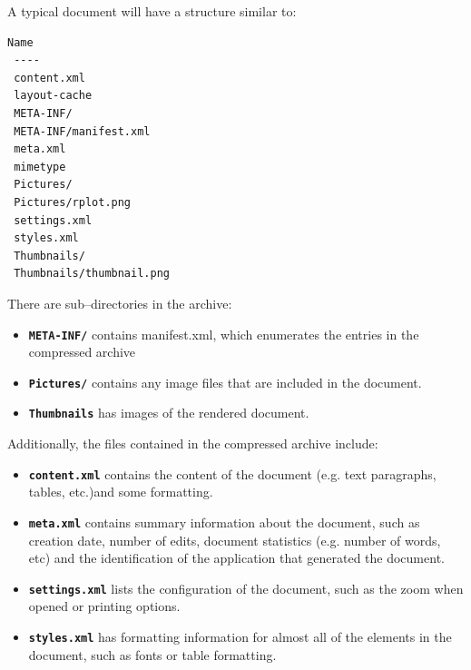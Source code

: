 \documentclass[12pt]{article}
\begin{document}
A typical document will have a structure similar to:
\begin{Verbatim}[samepage=true]
 Name
 ----
 content.xml
 layout-cache
 META-INF/
 META-INF/manifest.xml
 meta.xml
 mimetype
 Pictures/
 Pictures/rplot.png
 settings.xml
 styles.xml
 Thumbnails/
 Thumbnails/thumbnail.png
\end{Verbatim}

There are sub--directories in the archive:
\begin{itemize}
\item {\bf \tt META-INF/} contains manifest.xml, which enumerates the entries in the compressed archive
\item {\bf \tt Pictures/} contains any image files that are included in the document. 
\item {\bf \tt Thumbnails} has images of the rendered document.
\end{itemize}

Additionally, the files contained in the compressed archive include:
\begin{itemize}
\item {\bf \tt content.xml} contains the content of the document (e.g. text paragraphs, tables, etc.)and some formatting.
\item {\bf \tt meta.xml} contains summary information about the document, such as creation date, number of edits, document statistics (e.g. number of words, etc) and the identification of the application that generated the document.
\item {\bf \tt settings.xml} lists the configuration of the document, such as the zoom when opened or printing options.
\item {\bf \tt styles.xml} has formatting information for almost all of the elements in the document, such as fonts or table formatting.
\end{itemize}
\end{document}
